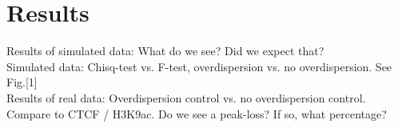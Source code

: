 \section{Results}

Results of simulated data: What do we see? Did we expect that?\\
Simulated data: Chisq-test vs. F-test, overdispersion vs. no overdispersion. See Fig.[1]\\
Results of real data: Overdispersion control vs. no overdispersion control.\\
Compare to CTCF / H3K9ac. Do we see a peak-loss? If so, what percentage?
  